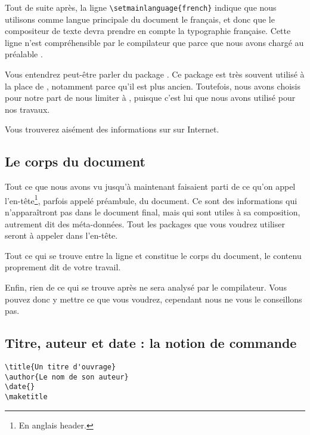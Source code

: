 Tout de suite après, la ligne \verb|\setmainlanguage{french}| indique que nous utilisons comme langue principale du document le fran\c cais, et donc que le compositeur de texte devra prendre en compte la typographie fran\c caise. Cette ligne n'est compréhensible par le compilateur que parce que nous avons chargé au préalable .

\begin{anedocte}
Vous entendrez peut-être parler du package . Ce package est très souvent utilisé à la place de , notamment parce qu'il est plus ancien. Toutefois, nous avons choisis pour notre part de nous limiter à , puisque c'est lui que nous avons utilisé pour nos travaux.

Vous trouverez aisément des informations sur  sur Internet.

\end{anedocte}

\subsection{Le corps du document}

Tout ce que nous avons vu jusqu'à maintenant faisaient parti de ce qu'on appel l'en-tête\footnote{En anglais header.}, parfois appelé préambule, du document. Ce sont des informations qui n'apparaîtront pas dans le document final, mais qui sont utiles à sa composition, autrement dit des méta-données. Tout les packages que vous voudrez utiliser seront à appeler dans l'en-tête.

Tout ce qui se trouve entre la ligne \verb|| et \verb|| constitue le corps du document, le contenu proprement dit de votre travail.

Enfin, rien de ce qui se trouve après \verb|| ne sera analysé par le compilateur. Vous pouvez donc y mettre ce que vous voudrez, cependant nous ne vous le conseillons pas.

\subsection{Titre, auteur et date : la notion de commande}

\begin{verbatim}
\title{Un titre d'ouvrage}
\author{Le nom de son auteur}
\date{}
\maketitle
\end{verbatim}


